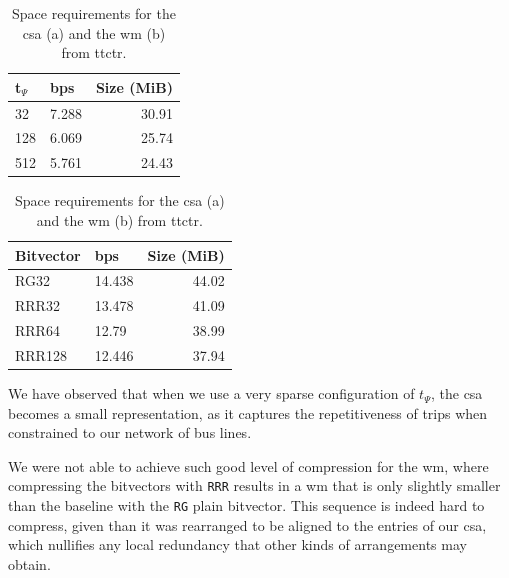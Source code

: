     \begin{table}[ht]
    \begin{center}
        \begin{subtable}[t]{.40\linewidth}
        \vspace{-12pt}
        \caption{}
        \begin{tabular}[t]{|l|l|r|}
            \hline
            t$_\Psi$ & bps & Size (MiB) \\
             \hline
            32 & 7.288 & 30.91 \\
            128 & 6.069 & 25.74 \\
            512 & 5.761 & 24.43 \\
            \hline
        \end{tabular}
        \end{subtable}%
        \begin{subtable}[t]{.40\linewidth}
        \vspace{-12pt}
        \caption{}
        \begin{tabular}[t]{|l|l|r|}
            \hline
            Bitvector & bps & Size (MiB) \\
             \hline
            RG32 & 14.438 & 44.02 \\
            RRR32 & 13.478 & 41.09 \\
            RRR64 & 12.79 & 38.99 \\
            RRR128 & 12.446 & 37.94 \\
            \hline
        \end{tabular}
        \end{subtable}
        \end{center}
        \caption{Space requirements for the \acrlong{csa} (a) and the \acrlong{wm} (b) from \acrshort{ttctr}.}
        \label{tab:ttctr}
    \end{table}
    
    We have observed that when we use a very sparse configuration of $t_\Psi$, the \gls{csa} becomes a small representation, as it captures the repetitiveness of trips when constrained to our network of bus lines.
    
    We were not able to achieve such good level of compression for the \gls{wm}, where compressing the bitvectors with \texttt{RRR} results in a \gls{wm} that is only slightly smaller than the baseline with the \texttt{RG} plain bitvector. This sequence is indeed hard to compress, given than it was rearranged to be aligned to the entries of our \gls{csa}, which nullifies any local redundancy that other kinds of arrangements may obtain.
    
